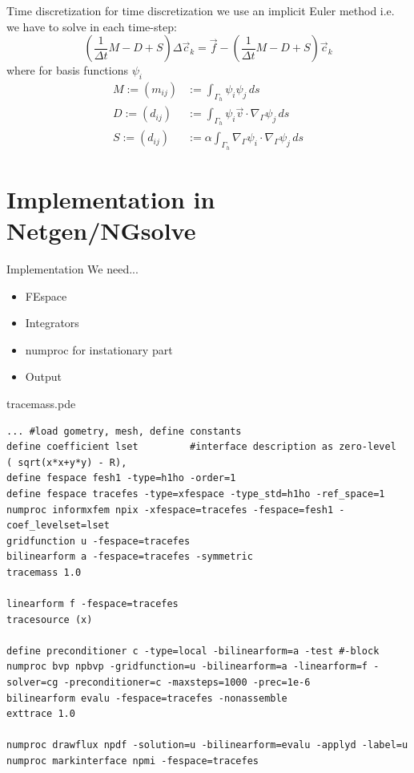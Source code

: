 \documentclass[11pt]{beamer}
\theoremstyle{plain}
\theoremstyle{definition}
\theoremstyle{remark}
\newcommand{\boundary}{\Gamma}
\begin{document}
\begin{frame}{Time discretization}
	for time discretization we use an implicit Euler method i.e. we have to solve in each time-step:
	\begin{equation}
		\left(\frac{1}{\Delta t}M-D+S\right)\Delta\vec c_{k}=\vec f-\left(\frac{1}{\Delta t}M-D+S\right)\vec c_k
	\end{equation}
	where for basis functions $\psi_i$
	\begin{align}
		M:=(m_{ij})&:=\int_{\boundary_h}\psi_i\psi_j\,ds\\
		D:=(d_{ij})&:=\int_{\boundary_h}\psi_i\vec v\cdot\nabla_\boundary\psi_j\,ds\\
		S:=(d_{ij})&:=\alpha\int_{\boundary_h}\nabla_\boundary\psi_i\cdot\nabla_\boundary\psi_j\,ds
	\end{align}
\end{frame}


\section{Implementation in Netgen/NGsolve}
\begin{frame}{Implementation}
	We need...
	\begin{itemize}[<+->]
		\item{FEspace}
		\item{Integrators}
		\item{numproc for instationary part}
		\item{Output}	
	\end{itemize}
\end{frame}


\begin{frame}[fragile]{tracemass.pde}
	\begin{lstlisting}
... #load gometry, mesh, define constants
define coefficient lset 		#interface description as zero-level
( sqrt(x*x+y*y) - R),
define fespace fesh1 -type=h1ho -order=1
define fespace tracefes -type=xfespace -type_std=h1ho -ref_space=1
numproc informxfem npix -xfespace=tracefes -fespace=fesh1 -coef_levelset=lset
gridfunction u -fespace=tracefes
bilinearform a -fespace=tracefes -symmetric
tracemass 1.0

linearform f -fespace=tracefes
tracesource (x) 

define preconditioner c -type=local -bilinearform=a -test #-block
numproc bvp npbvp -gridfunction=u -bilinearform=a -linearform=f -solver=cg -preconditioner=c -maxsteps=1000 -prec=1e-6
bilinearform evalu -fespace=tracefes -nonassemble
exttrace 1.0

numproc drawflux npdf -solution=u -bilinearform=evalu -applyd -label=u
numproc markinterface npmi -fespace=tracefes
	\end{lstlisting}
\end{frame}
\end{document}
